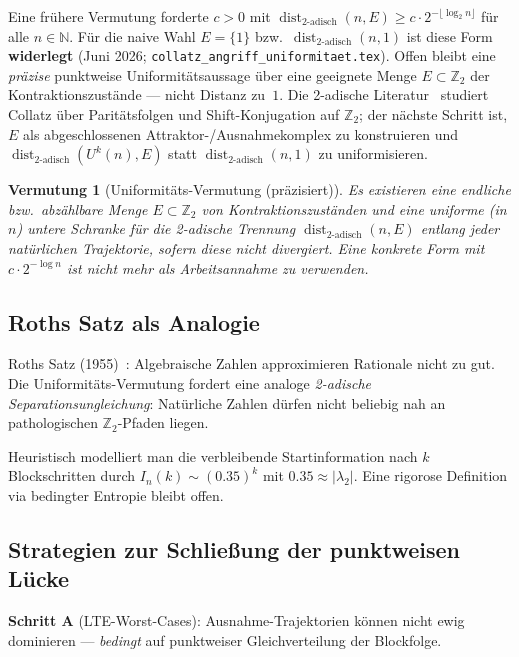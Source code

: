\documentclass[12pt,a4paper]{article}
\newtheorem{vermutung}[satz]{Vermutung}
\newcommand{\N}{\mathbb{N}}
\newcommand{\Ztwo}{\mathbb{Z}_2}
\newcommand{\disttwo}{\operatorname{dist}_{2\text{-adisch}}}
\begin{document}
\begin{tcolorbox}[heuristik,title={Uniformität (historische Form; heuristisch / widerlegt für $\disttwo(\cdot,1)$)}]
Eine frühere Vermutung forderte $c>0$ mit
$\disttwo(n,E)\geq c\cdot 2^{-\lfloor\log_2 n\rfloor}$ für alle $n\in\N$.
Für die naive Wahl $E=\{1\}$ bzw.\ $\disttwo(n,1)$ ist diese Form
\textbf{widerlegt} (Juni 2026; \texttt{collatz\_angriff\_uniformitaet.tex}).
Offen bleibt eine \emph{präzise} punktweise Uniformitätsaussage über eine
geeignete Menge $E\subset\Ztwo$ der Kontraktionszustände --- nicht Distanz zu~$1$.
Die 2-adische Literatur~\cite{BernsteinLagarias1996,Rozier2019} studiert Collatz
über Paritätsfolgen und Shift-Konjugation auf $\Ztwo$; der nächste Schritt ist,
$E$ als abgeschlossenen Attraktor-/Ausnahmekomplex zu konstruieren und
$\disttwo(U^k(n),E)$ statt $\disttwo(n,1)$ zu uniformisieren.
\end{tcolorbox}
\begin{vermutung}[Uniformitäts-Vermutung (präzisiert)]
\label{verm:uniform}
Es existieren eine endliche bzw.\ abzählbare Menge $E\subset\Ztwo$ von
Kontraktionszuständen und eine uniforme (in $n$) untere Schranke für die
2-adische Trennung $\disttwo(n,E)$ entlang jeder natürlichen Trajektorie,
sofern diese nicht divergiert. Eine konkrete Form mit $c\cdot 2^{-\log n}$
ist nicht mehr als Arbeitsannahme zu verwenden.
\end{vermutung}

\subsection{Roths Satz als Analogie}

Roths Satz (1955)~\cite{Roth1955}: Algebraische Zahlen approximieren Rationale
nicht zu gut. Die Uniformitäts-Vermutung fordert eine analoge
\emph{2-adische Separationsungleichung}: Natürliche Zahlen dürfen nicht
beliebig nah an pathologischen $\Ztwo$-Pfaden liegen.

Heuristisch modelliert man die verbleibende Startinformation nach
$k$ Blockschritten durch $I_n(k) \sim (0.35)^k$ mit
$0.35 \approx |\lambda_2|$. Eine rigorose Definition via bedingter
Entropie bleibt offen.

\subsection{Strategien zur Schließung der punktweisen Lücke}

\textbf{Schritt A} (LTE-Worst-Cases): Ausnahme-Trajektorien können nicht
ewig dominieren --- \emph{bedingt} auf punktweiser Gleichverteilung der
Blockfolge.
\end{document}
